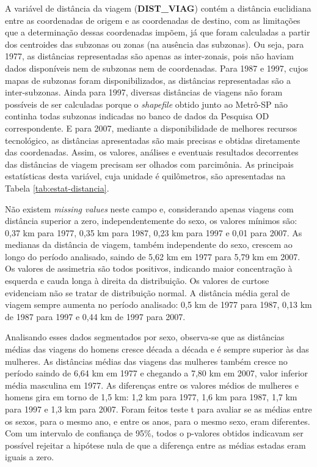 A variável de distância da viagem (\textbf{DIST_VIAG}) contém a distância euclidiana entre as coordenadas de origem e as coordenadas de destino, com as limitações que a determinação dessas coordenadas impõem, já que foram calculadas a partir dos centroides das subzonas ou zonas (na ausência das subzonas). Ou seja, para 1977, as distâncias representadas são apenas as inter-zonais, pois não haviam dados disponíveis nem de subzonas nem de coordenadas. Para 1987 e 1997, cujos mapas de subzonas foram disponibilizados, as distâncias representadas são a inter-subzonas. Ainda para 1997, diversas distâncias de viagens não foram possíveis de ser calculadas porque o \textit{shapefile} obtido junto ao Metrô-SP não continha todas subzonas indicadas no banco de dados da Pesquisa OD correspondente. E para 2007, mediante a disponibilidade de melhores recursos tecnológico, as distâncias apresentadas são mais precisas e obtidas diretamente das coordenadas. Assim, os valores, análises e eventuais resultados decorrentes das distâncias de viagem precisam ser olhados com parcimônia. As principais estatísticas desta variável, cuja unidade é quilômetros, são apresentadas na Tabela \ref{tab:estat-distancia}.

Não existem \textit{missing values} neste campo e, considerando apenas viagens com distância superior a zero, independentemente do sexo, os valores mínimos são: 0,37 km para 1977, 0,35 km para 1987, 0,23 km para 1997 e 0,01 para 2007.
As medianas da distância de viagem, também independente do sexo, crescem ao longo do período analisado, saindo de 5,62 km em 1977 para 5,79 km em 2007.
Os valores de assimetria são todos positivos, indicando maior concentração à esquerda e cauda longa à direita da distribuição.
Os valores de curtose evidenciam não se tratar de distribuição normal.
A distância média geral de viagem sempre aumenta no período analisado: 0,5 km de 1977 para 1987, 0,13 km de 1987 para 1997 e 0,44 km de 1997 para 2007.

Analisando esses dados segmentados por sexo, observa-se que as distâncias médias das viagens do homens cresce década a década e é sempre superior às das mulheres.
As distâncias médias das viagens das mulheres também cresce no período saindo de 6,64 km em 1977 e chegando a 7,80 km em 2007, valor inferior média masculina em 1977.
As diferenças entre os valores médios de mulheres e homens gira em torno de 1,5 km: 1,2 km para 1977, 1,6 km para 1987, 1,7 km para 1997 e 1,3 km para 2007.
Foram feitos teste t para avaliar se as médias entre os sexos, para o mesmo ano, e entre os anos, para o mesmo sexo, eram diferentes. Com um intervalo de confiança de 95\%, todos o p-valores obtidos indicavam ser possível rejeitar a hipótese nula de que a diferença entre as médias estadas eram iguais a zero.

